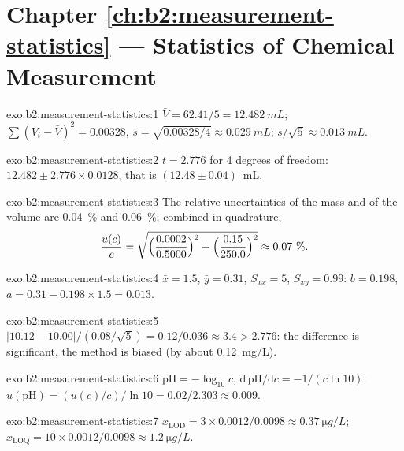 \section*{Chapter \ref{ch:b2:measurement-statistics} --- Statistics of Chemical Measurement}

\begin{solution}{exo:b2:measurement-statistics:1}
$\bar V = 62.41/5 = \qty{12.482}{mL}$; $\sum(V_i - \bar V)^2 = 0.00328$, $s = \sqrt{0.00328/4} \approx
\qty{0.029}{mL}$; $s/\sqrt5 \approx \qty{0.013}{mL}$.
\end{solution}

\begin{solution}{exo:b2:measurement-statistics:2}
$t = 2.776$ for 4 degrees of freedom: $12.482 \pm 2.776 \times 0.0128$, that is $(12.48 \pm 0.04)$~mL.
\end{solution}

\begin{solution}{exo:b2:measurement-statistics:3}
The relative uncertainties of the mass and of the volume are 0.04~\% and 0.06~\%; combined in
quadrature,
\[\frac{u(c)}{c} = \sqrt{\Bigl(\frac{0.0002}{0.5000}\Bigr)^2 + \Bigl(\frac{0.15}{250.0}\Bigr)^2}
\approx 0.07~\%.\]
\end{solution}

\begin{solution}{exo:b2:measurement-statistics:4}
$\bar x = 1.5$, $\bar y = 0.31$, $S_{xx} = 5$, $S_{xy} = 0.99$: $b = 0.198$, $a = 0.31 - 0.198 \times 1.5
= 0.013$.
\end{solution}

\begin{solution}{exo:b2:measurement-statistics:5}
$|10.12 - 10.00|/(0.08/\sqrt5) = 0.12/0.036 \approx 3.4 > 2.776$: the difference is significant, the
method is biased (by about \qty{+0.12}{mg/L}).
\end{solution}

\begin{solution}{exo:b2:measurement-statistics:6}
$\mathrm{pH} = -\log_{10}c$, $\mathrm d\,\mathrm{pH}/\mathrm dc = -1/(c\ln10)$:
$u(\mathrm{pH}) = (u(c)/c)/\ln10 = 0.02/2.303 \approx 0.009$.
\end{solution}

\begin{solution}{exo:b2:measurement-statistics:7}
$x_{\mathrm{LOD}} = 3 \times 0.0012/0.0098 \approx \qty{0.37}{\micro g/L}$; $x_{\mathrm{LOQ}} = 10
\times 0.0012/0.0098 \approx \qty{1.2}{\micro g/L}$.
\end{solution}

